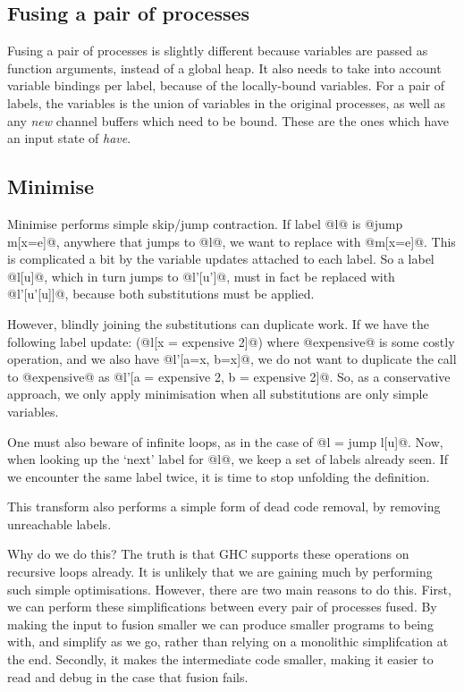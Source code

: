 
\subsection{Fusing a pair of processes}
Fusing a pair of processes is slightly different because variables are passed as function arguments, instead of a global heap.
It also needs to take into account variable bindings per label, because of the locally-bound variables.
For a pair of labels, the variables is the union of variables in the original processes, as well as any \emph{new} channel buffers which need to be bound.
These are the ones which have an input state of \emph{have}.

\subsection{Minimise}
Minimise performs simple skip/jump contraction.
If label @l@ is @jump m[x=e]@, anywhere that jumps to @l@, we want to replace with @m[x=e]@.
This is complicated a bit by the variable updates attached to each label.
So a label @l[u]@, which in turn jumps to @l'[u']@, must in fact be replaced with @l'[u'[u]]@, because both substitutions must be applied.

However, blindly joining the substitutions can duplicate work.
If we have the following label update: (@l[x = expensive 2]@) where @expensive@ is some costly operation, and we also have @l'[a=x, b=x]@, we do not want to duplicate the call to @expensive@ as @l'[a = expensive 2, b = expensive 2]@.
So, as a conservative approach, we only apply minimisation when all substitutions are only simple variables.

One must also beware of infinite loops, as in the case of @l = jump l[u]@.
Now, when looking up the `next' label for @l@, we keep a set of labels already seen.
If we encounter the same label twice, it is time to stop unfolding the definition.

This transform also performs a simple form of dead code removal, by removing unreachable labels.

Why do we do this?
The truth is that GHC supports these operations on recursive loops already.
It is unlikely that we are gaining much by performing such simple optimisations.
However, there are two main reasons to do this.
First, we can perform these simplifications between every pair of processes fused.
By making the input to fusion smaller we can produce smaller programs to being with, and simplify as we go, rather than relying on a monolithic simplifcation at the end.
Secondly, it makes the intermediate code smaller, making it easier to read and debug in the case that fusion fails.



